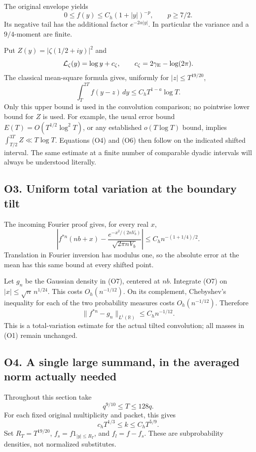 \documentclass[
  11pt,
]{article}
\begin{document}
The original envelope yields \[
0\le f(y)\le C_h(1+|y|)^{-p},\qquad p\ge7/2.
\tag{O5}
\] Its negative tail has the additional factor \(e^{-2\alpha|y|}\). In
particular the variance and a \(9/4\)-moment are finite.

Put \(Z(y)=|\zeta(1/2+iy)|^2\) and \[
\mathcal L_\zeta(y)=\log y+c_\zeta,\qquad
c_\zeta=2\gamma_{\rm E}-\log(2\pi).
\] The classical mean-square formula gives, uniformly for
\(|z|\le T^{19/20}\), \[
\int_T^{2T}f(y-z)\,dy\le C_h T^{1-a}\log T.\tag{O6}
\] Only this upper bound is used in the convolution comparison; no
pointwise lower bound for \(Z\) is used. For example, the usual error
bound \(E(T)=O(T^{1/2}\log^2T)\), or any established \(o(T\log T)\)
bound, implies \(\int_{T/2}^{3T}Z\ll T\log T\). Equations (O4) and (O6)
then follow on the indicated shifted interval. The same estimate at a
finite number of comparable dyadic intervals will always be understood
literally.

\subsection{O3. Uniform total variation at the boundary
tilt}\label{o3.-uniform-total-variation-at-the-boundary-tilt}

The incoming Fourier proof gives, for every real \(x\), \[
\left|f^{*n}(nb+x)-
\frac{e^{-x^2/(2nV_b)}}{\sqrt{2\pi nV_b}}\right|
\le C_h n^{-(1+1/4)/2}.\tag{O7}
\] Translation in Fourier inversion has modulus one, so the absolute
error at the mean has this same bound at every shifted point.

Let \(g_n\) be the Gaussian density in (O7), centered at \(nb\).
Integrate (O7) on \(|x|\le\sqrt n\,n^{1/24}\). This costs
\(O_h(n^{-1/12})\). On its complement, Chebyshev's inequality for each
of the two probability measures costs \(O_h(n^{-1/12})\). Therefore \[
\boxed{\|f^{*n}-g_n\|_{L^1(\mathbb R)}\le C_h n^{-1/12}.}\tag{O8}
\] This is a total-variation estimate for the actual tilted convolution;
all masses in (O1) remain unchanged.

\subsection{O4. A single large summand, in the averaged norm actually
needed}\label{o4.-a-single-large-summand-in-the-averaged-norm-actually-needed}

Throughout this section take \[
q^{9/10}\le T\le128q.
\] For each fixed original multiplicity and packet, this gives \[
c_hT^{1/3}\le k\le C_hT^{5/9}.\tag{O9}
\] Set \(R_T=T^{19/20}\), \(f_s=f1_{|y|\le R_T}\), and \(f_l=f-f_s\).
These are subprobability densities, not normalized substitutes.
\end{document}
